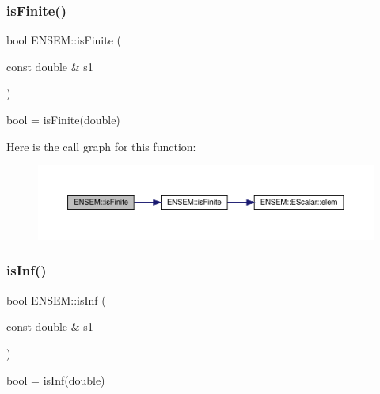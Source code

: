 \subsubsection{\texorpdfstring{isFinite()}{isFinite()}}
{\footnotesize\ttfamily bool E\+N\+S\+E\+M\+::is\+Finite (\begin{DoxyParamCaption}\item[{const double \&}]{s1 }\end{DoxyParamCaption})\hspace{0.3cm}{\ttfamily [inline]}}



bool = is\+Finite(double) 

Here is the call graph for this function\+:\nopagebreak
\begin{figure}[H]
\begin{center}
\leavevmode
\includegraphics[width=350pt]{dd/d99/group__simpleword_ga9bc1e56e3c76d5eb1575eb3eed62ea40_cgraph}
\end{center}
\end{figure}
\mbox{\label{group__simpleword_ga915c6e8e5b5de2ebf1b3a8e57f95bf2f}} 
\subsubsection{\texorpdfstring{isInf()}{isInf()}}
{\footnotesize\ttfamily bool E\+N\+S\+E\+M\+::is\+Inf (\begin{DoxyParamCaption}\item[{const double \&}]{s1 }\end{DoxyParamCaption})\hspace{0.3cm}{\ttfamily [inline]}}



bool = is\+Inf(double) 

\mbox{\label{group__simpleword_gaa7a998c5bfdb665a4e386ccc415407bd}} 
